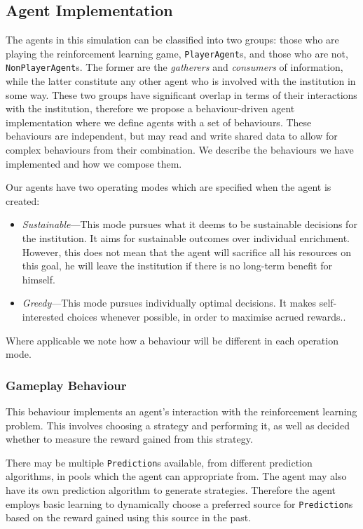 \subsection{Agent Implementation}

The agents in this simulation can be classified into two groups: those who are
playing the reinforcement learning game, \texttt{PlayerAgent}s, and those who
are not, \texttt{NonPlayerAgent}s. The former are the \emph{gatherers} and
\emph{consumers} of information, while the latter constitute any other agent
who is involved with the institution in some way. These two groups have
significant overlap in terms of their interactions with the institution,
therefore we propose a behaviour-driven agent implementation where we define
agents with a set of behaviours. These behaviours are independent, but may
read and write shared data to allow for complex behaviours from their
combination. We describe the behaviours we have implemented and how we compose
them.

Our agents have two operating modes which are specified when the agent is created:

\begin{itemize}
\item \emph{Sustainable}---This mode pursues what it deems to be sustainable decisions for the institution. It aims for sustainable outcomes over individual enrichment. However, this does not mean that the agent will sacrifice all his resources on this goal, he will leave the institution if there is no long-term benefit for himself.
\item \emph{Greedy}---This mode pursues individually optimal decisions. It makes self-interested choices whenever possible, in order to maximise acrued rewards..
\end{itemize}

Where applicable we note how a behaviour will be different in each operation mode.

\subsubsection*{Gameplay Behaviour}

This behaviour implements an agent's interaction with the reinforcement
learning problem. This involves choosing a strategy and performing it, as well
as decided whether to measure the reward gained from this strategy.

There may be multiple \texttt{Prediction}s available, from different
prediction algorithms, in pools which the agent can appropriate from. The
agent may also have its own prediction algorithm to generate strategies.
Therefore the agent employs basic learning to dynamically choose a preferred
source for \texttt{Prediction}s based on the reward gained using this source
in the past.

